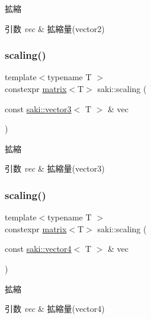 拡縮 


\begin{DoxyParams}{引数}
{\em vec} & 拡縮量(vector2) \\
\hline
\end{DoxyParams}
\mbox{\label{namespacesaki_affcd920fe27abc17e5fa50f04bfabe05}} 
\subsubsection{\texorpdfstring{scaling()}{scaling()}\hspace{0.1cm}{\footnotesize\ttfamily [2/3]}}
{\footnotesize\ttfamily template$<$typename T $>$ \\
constexpr \mbox{\hyperlink{classsaki_1_1matrix}{matrix}}$<$T$>$ saki\+::scaling (\begin{DoxyParamCaption}\item[{const \mbox{\hyperlink{classsaki_1_1vector3}{saki\+::vector3}}$<$ T $>$ \&}]{vec }\end{DoxyParamCaption})}



拡縮 


\begin{DoxyParams}{引数}
{\em vec} & 拡縮量(vector3) \\
\hline
\end{DoxyParams}
\mbox{\label{namespacesaki_aededd0f357c48d1e96af77b06cb3e786}} 
\subsubsection{\texorpdfstring{scaling()}{scaling()}\hspace{0.1cm}{\footnotesize\ttfamily [3/3]}}
{\footnotesize\ttfamily template$<$typename T $>$ \\
constexpr \mbox{\hyperlink{classsaki_1_1matrix}{matrix}}$<$T$>$ saki\+::scaling (\begin{DoxyParamCaption}\item[{const \mbox{\hyperlink{classsaki_1_1vector4}{saki\+::vector4}}$<$ T $>$ \&}]{vec }\end{DoxyParamCaption})}



拡縮 


\begin{DoxyParams}{引数}
{\em vec} & 拡縮量(vector4) \\
\hline
\end{DoxyParams}
\mbox{\label{namespacesaki_ae518b81f2ab4bba826a913a430a0716f}} 
